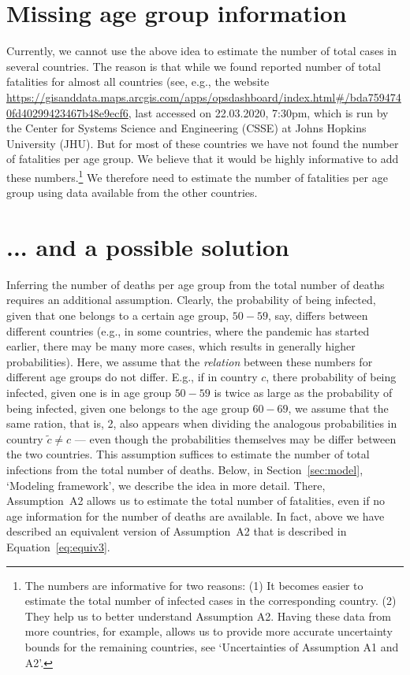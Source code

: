 \documentclass[a4paper]{article}
\begin{document}
\section{Missing age group information} \label{sec:noage}
Currently, we cannot use the above idea to 
estimate the number of total cases in 
several countries. The reason is that 
while we found reported number of total fatalities 
for almost all countries 
(see, e.g., the website {\footnotesize
\url{https://gisanddata.maps.arcgis.com/apps/opsdashboard/index.html#/bda7594740fd40299423467b48e9ecf6}},
last accessed on 22.03.2020, 7:30pm,
which is run by the Center for Systems Science and Engineering ({CSSE}) at Johns Hopkins University ({JHU}).
But for most of these countries we have not found the number of fatalities per age group. 
We believe that it would be highly informative to add these numbers.\footnote{The numbers 
are informative for two reasons: (1) It
becomes easier to estimate the 
total number of infected cases in the 
corresponding country.
(2) They help us to better understand Assumption A2. Having these data from 
more countries, for example, 
allows us to 
provide more accurate uncertainty bounds for 
the remaining countries, see `Uncertainties of Assumption A1 and A2'.}
We therefore need to estimate the number of fatalities per age group using data available from the other countries.


\section{... and a possible solution}
Inferring the number of deaths per age group from the total number of deaths requires an additional assumption. 
Clearly, 
the probability of
being infected, given that one 
belongs to a certain age group, $50-59$, say, 
differs between different countries (e.g., in some countries, 
where the pandemic has started earlier, there may be many more cases, which results in generally higher probabilities).
Here, we assume that the \emph{relation} between these numbers for different age groups do not differ.
E.g., if 
in country $c$, there 
probability of being infected, given one is in age group $50-59$
is twice as large as the probability of being infected, given 
one belongs to the age group $60-69$, 
we assume that the same ration, that is, 2, 
also appears when dividing the analogous probabilities in country $\tilde{c} \neq c$ --- even though the probabilities themselves may be differ between the two countries. 
This assumption suffices to estimate the number of total infections
from the total number of deaths.
Below, in Section~\ref{sec:model}, `Modeling framework', we describe the idea in more detail. 
There, Assumption~A2 allows us to 
estimate the total number of fatalities, even if 
no age information for the number of deaths are available.
In fact, above we have described an equivalent version of Assumption~A2 that is described in Equation~\eqref{eq:equiv3}.
\end{document}
